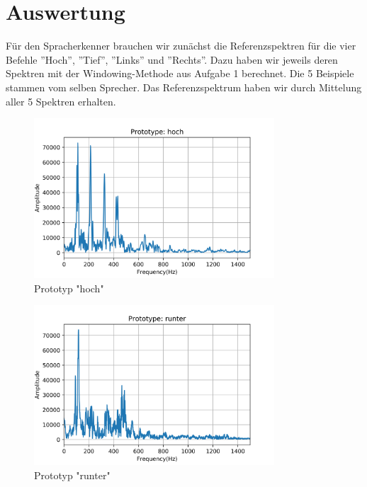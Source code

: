 \documentclass[12pt, oneside, a4paper, \docLanguage]{report}
\begin{document}
\section{Auswertung}
\label{chap:VERSUCH_2_AUSWERTUNG}
\begin{normalsize}
Für den Spracherkenner brauchen wir zunächst die Referenzspektren für die vier Befehle
”Hoch”, ”Tief”, ”Links” und ”Rechts”. Dazu haben wir jeweils deren Spektren mit der Windowing-Methode aus Aufgabe 1 berechnet.
Die 5 Beispiele stammen vom selben Sprecher. Das Referenzspektrum haben wir durch Mittelung aller 5 Spektren erhalten.
\begin{figure}[H]
\centering
	\includegraphics[width=0.8\textwidth]{../Images/hoch_proto.png}
	\caption{Prototyp "hoch"}
\end{figure}

\begin{figure}[H]
\centering
	\includegraphics[width=0.8\textwidth]{../Images/runter_proto.png}
	\caption{Prototyp "runter"}
\end{figure}


\end{normalsize}
\end{document}
